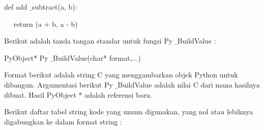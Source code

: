 \documentclass{wileySix}
\begin{document}
\begin{myEnumerate}
{\begin{myEnumerate}
\noindent 
def add $  \_  $subtract(a, b): \par
\noindent 
~~ return (a + b, a - b) \par
\vspace{14pt}
Berikut adalah tanda tangan standar untuk fungsi Py $  \_  $BuildValue  : \par
\noindent 
PyObject* Py $  \_  $BuildValue(char* format,...) \par
\vspace{14pt}
Format berikut adalah string C yang menggambarkan objek Python untuk dibangun. Argumentasi berikut Py $  \_  $BuildValue adalah nilai C dari mana hasilnya dibuat. Hasil PyObject * adalah referensi baru.  \par
Berikut daftar tabel string kode yang umum digunakan, yang nol atau lebihnya digabungkan ke dalam format string : \par





\end{myEnumerate}}
\end{myEnumerate}
\end{document}
